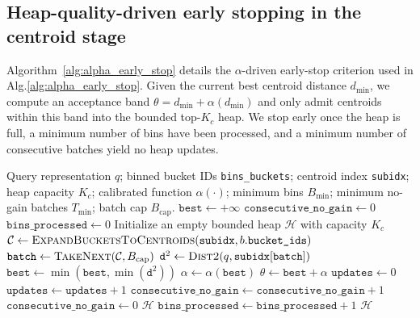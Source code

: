 \documentclass[sigconf, nonacm]{acmart}
\begin{document}
\subsection{Heap-quality-driven early stopping in the centroid stage}
\label{app:alpha_early_stop}

Algorithm~\ref{alg:alpha_early_stop} details the $\alpha$-driven early-stop criterion used in Alg.\ref{alg:alpha_early_stop}.
Given the current best centroid distance $d_{\min}$, we compute an acceptance band $\theta = d_{\min} + \alpha(d_{\min})$ and only admit centroids within this band into the bounded top-$K_c$ heap.
We stop early once the heap is full, a minimum number of bins have been processed, and a minimum number of consecutive batches yield no heap updates.

\begin{algorithm}[t]
\caption{$\alpha$-driven early stopping in the centroid stage (single query).}
\label{alg:alpha_early_stop}
\begin{algorithmic}[1]
\Require Query representation $q$; binned bucket IDs \texttt{bins\_buckets}; centroid index \texttt{subidx};
heap capacity $K_c$; calibrated function $\alpha(\cdot)$;
minimum bins $B_{\min}$; minimum no-gain batches $T_{\min}$; batch cap $B_{\text{cap}}$.
\State $\texttt{best} \gets +\infty$
\State $\texttt{consecutive\_no\_gain} \gets 0$
\State $\texttt{bins\_processed} \gets 0$
\State Initialize an empty bounded heap $\mathcal{H}$ with capacity $K_c$
  \State $\mathcal{C} \gets \textsc{ExpandBucketsToCentroids}(\texttt{subidx}, b.\texttt{bucket\_ids})$
    \State $\texttt{batch} \gets \textsc{TakeNext}(\mathcal{C}, B_{\text{cap}})$
    \State $\texttt{d}^2 \gets \textsc{Dist2}(q, \texttt{subidx}[\texttt{batch}])$
    \State $\texttt{best} \gets \min(\texttt{best}, \min(\texttt{d}^2))$
    \State $\alpha \gets \alpha(\texttt{best})$ 
    \State $\theta \gets \texttt{best} + \alpha$
    \State $\texttt{updates} \gets 0$
          \State $\texttt{updates} \gets \texttt{updates} + 1$
        \EndIf
      \EndIf
    \EndFor
      \State $\texttt{consecutive\_no\_gain} \gets \texttt{consecutive\_no\_gain} + 1$
    \Else
      \State $\texttt{consecutive\_no\_gain} \gets 0$
    \EndIf
      \State \Return $\mathcal{H}$
    \EndIf
  \EndWhile
  \State $\texttt{bins\_processed} \gets \texttt{bins\_processed} + 1$
\EndFor
\State \Return $\mathcal{H}$
\end{algorithmic}
\end{algorithm}
\end{document}
